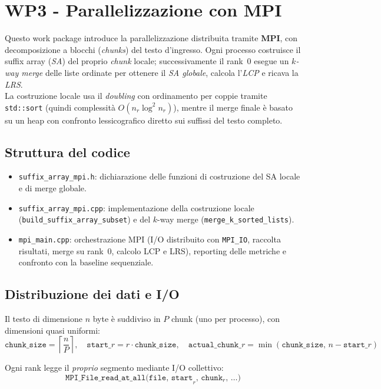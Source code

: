 \chapter{WP3 - Parallelizzazione con MPI}
	
	Questo work package introduce la parallelizzazione distribuita tramite \textbf{MPI}, con decomposizione a blocchi (\textit{chunks}) del testo d'ingresso.
	Ogni processo costruisce il suffix array (\emph{SA}) del proprio \emph{chunk} locale; successivamente il rank~0 esegue un \emph{$k$-way merge} delle liste ordinate per ottenere il \emph{SA globale}, calcola l'\emph{LCP} e ricava la \emph{LRS}. \\
	La costruzione locale usa il \emph{doubling} con ordinamento per coppie tramite \texttt{std::sort} (quindi complessità $O(n_r \log^2 n_r)$), mentre il merge finale è basato su un heap con confronto lessicografico diretto sui suffissi del testo completo.
	
	\section{Struttura del codice}
		\begin{itemize}
			\item \texttt{suffix\_array\_mpi.h}: dichiarazione delle funzioni di costruzione del SA locale e di merge globale.
			\item \texttt{suffix\_array\_mpi.cpp}: implementazione della costruzione locale (\texttt{build\_suffix\_array\_subset}) e del $k$-way merge (\texttt{merge\_k\_sorted\_lists}).
			\item \texttt{mpi\_main.cpp}: orchestrazione MPI (I/O distribuito con \texttt{MPI\_IO}, raccolta risultati, merge su rank~0, calcolo LCP e LRS), reporting delle metriche e confronto con la baseline sequenziale.
		\end{itemize}
	
	\section{Distribuzione dei dati e I/O}
		Il testo di dimensione $n$ byte è suddiviso in $P$ chunk (uno per processo), con dimensioni quasi uniformi:
		$$
		\texttt{chunk\_size} = \left\lceil \frac{n}{P} \right\rceil, \quad
		\texttt{start}\_r = r \cdot \texttt{chunk\_size}, \quad
		\texttt{actual\_chunk}\_r = \min(\texttt{chunk\_size},\, n - \texttt{start}\_r)
		$$
		
		Ogni rank legge il \emph{proprio} segmento mediante I/O collettivo:
		\[
			\texttt{MPI\_File\_read\_at\_all(file, start}_r,\, \texttt{chunk}_r,\, \dots)
		\]
		
